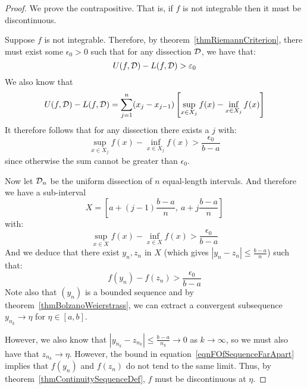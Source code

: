 \documentclass[../Main.tex]{subfiles}
\begin{document}
\begin{proof}
    We prove the contrapositive. That is, if $f$ is not integrable then it must be discontinuous.

    Suppose $f$ is not integrable. Therefore, by theorem~\ref{thmRiemannCriterion}, there must exist some $\epsilon_0 > 0$ such that for any dissection $\mathcal{D}$, we have that:
    \begin{equation*}
        U(f, \mathcal{D}) - L(f, \mathcal{D}) > \varepsilon_0
    \end{equation*}
    We also know that
    \begin{equation*}
        U(f, \mathcal{D}) - L(f, \mathcal{D}) = \sum_{j = 1}^n (x_j - x_{j - 1})\left[\sup_{x \in X_j} f(x) - \inf_{x \in X_j} f(x)\right]
    \end{equation*}
    It therefore follows that for any dissection there exists a $j$ with:
    \begin{equation*}
        \sup_{x \in X_j} f(x) - \inf_{x \in X_j} f(x) > \frac{\epsilon_0}{b - a}
    \end{equation*}
    since otherwise the sum cannot be greater than $\epsilon_0$.

    Now let $\mathcal{D}_n$ be the uniform dissection of $n$ equal-length intervals. And therefore we have a sub-interval
    \begin{equation*}
        X = \left[a + (j - 1) \frac{b - a}{n},~a + j\frac{b-a}{n}\right]
    \end{equation*}
    with:
    \begin{equation*}
        \sup_{x \in X} f(x) - \inf_{x \in X} f(x) > \frac{\epsilon_0}{b - a}
    \end{equation*}
    And we deduce that there exist $y_n, z_n$ in $X$ (which gives $|y_n - z_n| \leq \frac{b - a}{n}$) such that:
    \begin{equation}
        f(y_n) - f(z_n) > \frac{\epsilon_0}{b - a}
        \label{eqnFOfSequenceFarApart}
    \end{equation}
    Note also that $(y_n)$ is a bounded sequence and by theorem~\ref{thmBolzanoWeierstrass}, we can extract a convergent subsequence $y_{n_k} \to \eta$ for $\eta \in [a, b]$.

    However, we also know that $|y_{n_k} - z_{n_k}| \leq \frac{b-a}{n_k} \to 0$ as $k \to \infty$, so we must also have that $z_{n_k} \to \eta$. However, the bound in equation~\ref{eqnFOfSequenceFarApart} implies that $f(y_n)$ and $f(z_n)$ do not tend to the same limit. Thus, by theorem~\ref{thmContinuitySequenceDef}, $f$ must be discontinuous at $\eta$.
\end{proof}
\end{document}
